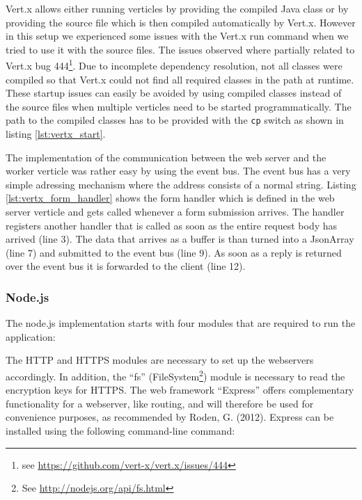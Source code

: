 

Vert.x allows either running verticles by providing the compiled Java class or by providing the
source file which is then compiled automatically by Vert.x. However in this
setup we experienced some issues with the Vert.x run command when we tried to
use it with the source files. The issues observed where partially related to
Vert.x bug 444\footnote{see \url{https://github.com/vert-x/vert.x/issues/444}}.
Due to incomplete dependency resolution, not all classes were compiled so that
Vert.x could not find all required classes in the path at runtime.
These startup issues can easily be avoided by using compiled classes instead of
the source files when multiple verticles need to be started programmatically.
The path to the compiled classes has to be provided with the \texttt{cp} switch as
shown in listing \ref{lst:vertx_start}.





The implementation of the communication between the web server and the worker
verticle was rather easy by using the event bus. The event bus has a very
simple adressing mechanism where the address consists of a normal string.
Listing \ref{lst:vertx_form_handler} shows the form handler which is defined
in the web server verticle and gets called whenever a form submission arrives.
The handler registers another handler that is called as soon as the entire
request body has arrived (line 3). The data that arrives as a buffer is than
turned into a JsonArray (line 7) and submitted to the event bus (line 9).
As soon as a reply is returned over the event bus it is forwarded to the client (line 12).



\subsubsection{Node.js}
\label{implementation_node}
The node.js implementation starts with four modules that are required to run the application:



The HTTP and HTTPS modules are necessary to set up the webservers accordingly. 
In addition, the “fs” (FileSystem\footnote{See \url{ http://nodejs.org/api/fs.html}}) module is necessary to read the encryption keys for HTTPS. The web framework “Express” offers complementary functionality for a webserver, like routing, 
and will therefore be used for convenience purposes, as recommended by Roden, G. (2012). 
Express can be installed using the following command-line command:\\

